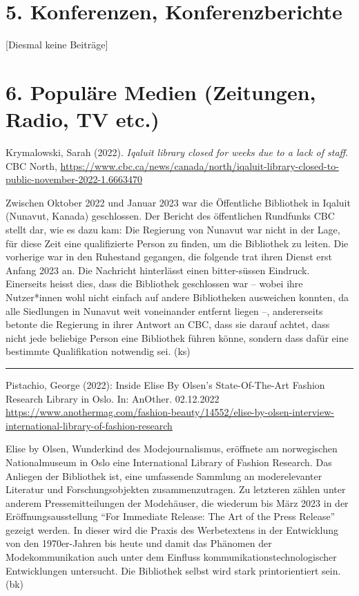 \documentclass[a4paper,
fontsize=11pt,
oneside,
numbers=noperiodatend,
parskip=half-,
bibliography=totoc,
final
]{scrartcl}
\begin{document}
\hypertarget{konferenzen-konferenzberichte}{%
\section{5. Konferenzen,
Konferenzberichte}\label{konferenzen-konferenzberichte}}

{[}Diesmal keine Beiträge{]}

\hypertarget{populuxe4re-medien-zeitungen-radio-tv-etc.}{%
\section{6. Populäre Medien (Zeitungen, Radio, TV
etc.)}\label{populuxe4re-medien-zeitungen-radio-tv-etc.}}

Krymalowski, Sarah (2022). \emph{Iqaluit library closed for weeks due to
a lack of staff}. CBC North,
\url{https://www.cbc.ca/news/canada/north/iqaluit-library-closed-to-public-november-2022-1.6663470}

Zwischen Oktober 2022 und Januar 2023 war die Öffentliche Bibliothek in
Iqaluit (Nunavut, Kanada) geschlossen. Der Bericht des öffentlichen
Rundfunks CBC stellt dar, wie es dazu kam: Die Regierung von Nunavut war
nicht in der Lage, für diese Zeit eine qualifizierte Person zu finden,
um die Bibliothek zu leiten. Die vorherige war in den Ruhestand
gegangen, die folgende trat ihren Dienst erst Anfang 2023 an. Die
Nachricht hinterlässt einen bitter-süssen Eindruck. Einerseits heisst
dies, dass die Bibliothek geschlossen war -- wobei ihre Nutzer*innen
wohl nicht einfach auf andere Bibliotheken ausweichen konnten, da alle
Siedlungen in Nunavut weit voneinander entfernt liegen --, andererseits
betonte die Regierung in ihrer Antwort an CBC, dass sie darauf achtet,
dass nicht jede beliebige Person eine Bibliothek führen könne, sondern
dass dafür eine bestimmte Qualifikation notwendig sei. (ks)

\begin{center}\rule{0.5\linewidth}{0.5pt}\end{center}

Pistachio, George (2022): Inside Elise By Olsen's State-Of-The-Art
Fashion Research Library in Oslo. In: AnOther. 02.12.2022
\url{https://www.anothermag.com/fashion-beauty/14552/elise-by-olsen-interview-international-library-of-fashion-research}

Elise by Olsen, Wunderkind des Modejournalismus, eröffnete am
norwegischen Nationalmuseum in Oslo eine International Library of
Fashion Research. Das Anliegen der Bibliothek ist, eine umfassende
Sammlung an moderelevanter Literatur und Forschungsobjekten
zusammenzutragen. Zu letzteren zählen unter anderem Pressemitteilungen
der Modehäuser, die wiederum bis März 2023 in der Eröffnungsausstellung
\enquote{For Immediate Release: The Art of the Press Release} gezeigt
werden. In dieser wird die Praxis des Werbetextens in der Entwicklung
von den 1970er-Jahren bis heute und damit das Phänomen der
Modekommunikation auch unter dem Einfluss kommunikationstechnologischer
Entwicklungen untersucht. Die Bibliothek selbst wird stark
printorientiert sein. (bk)
\end{document}
